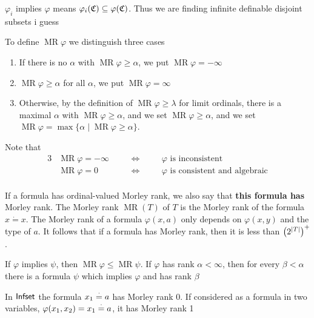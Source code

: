 \documentclass[11pt]{article}
\DeclareMathOperator{\MR}{MR}
\begin{document}
\begin{remark}
\(\varphi_i\) implies \(\varphi\) means \(\varphi_i(\mathfrak{C})\subseteq\varphi(\mathfrak{C})\). Thus we are finding infinite definable disjoint subsets i guess
\end{remark}

\begin{definition}[]
To define \(\MR\varphi\) we distinguish three cases
\begin{enumerate}
\item If there is no \(\alpha\) with \(\MR\varphi\ge\alpha\), we put \(\MR\varphi=-\infty\)
\item \(\MR\varphi\ge\alpha\) for all \(\alpha\), we put \(\MR\varphi=\infty\)
\item Otherwise, by the definition of \(\MR\varphi\ge\lambda\) for limit ordinals, there is a maximal \(\alpha\)
with \(\MR\varphi\ge\alpha\), and we set \(\MR\varphi\ge\alpha\), and we set \(\MR\varphi=\max\{\alpha\mid\MR\varphi\ge\alpha\}\).
\end{enumerate}
\end{definition}

Note that
\begin{alignat*}{3}
&\MR\varphi=-\infty\quad&&\Leftrightarrow\quad&&\varphi\text{ is inconsistent}\\
&\MR\varphi=0\quad&&\Leftrightarrow\quad&&\varphi\text{ is consistent and algebraic}\\
\end{alignat*}

If a formula has ordinal-valued Morley rank, we also say that \textbf{this formula has} Morley rank. The
Morley rank \(\MR(T)\) of \(T\) is the Morley rank of the formula \(x\dot=x\).  The Morley rank
of a formula \(\varphi(x,a)\) only depends on \(\varphi(x,y)\) and the type of \(a\). It follows that if a
formula has Morley rank, then it is less than \(\left( 2^{\abs{T}} \right)^+\).  \label{Problem9}

\begin{remark}
If \(\varphi\) implies \(\psi\), then \(\MR\varphi\le\MR\psi\). If \(\varphi\) has rank \(\alpha<\infty\), then for every \(\beta<\alpha\) there is a
formula \(\psi\) which implies \(\varphi\) and has rank \(\beta\)
\end{remark}

\begin{examplle}[]
In \(\operatorname{\textsf{Infset}}\) the formula \(x_1\stackrel{\cdot}= a\) has Morley rank 0.
If considered as a formula in two variables, \(\varphi(x_1,x_2)=x_1\stackrel{\cdot}= a\), it has Morley rank 1
\end{examplle}
\end{document}

